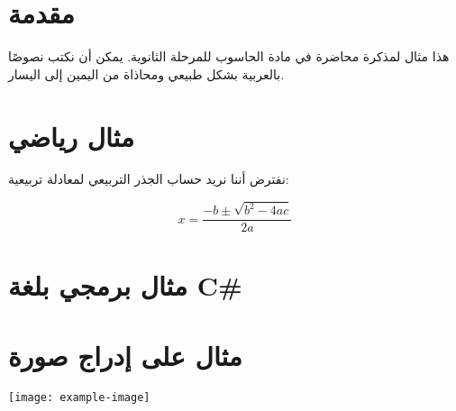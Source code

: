 \documentclass[12pt]{article}
\newif\ifwithcode
\begin{document}
\section*{مقدمة}

هذا مثال لمذكرة محاضرة في مادة الحاسوب للمرحلة الثانوية.
يمكن أن نكتب نصوصًا بالعربية بشكل طبيعي ومحاذاة من اليمين إلى اليسار.

\section*{مثال رياضي}

نفترض أننا نريد حساب الجذر التربيعي لمعادلة تربيعية:

\begin{equation}
x = \frac{-b \pm \sqrt{b^2 - 4ac}}{2a}
\end{equation}

\section*{مثال برمجي بلغة C\#}

\ifwithcode
\begin{english}
\begin{lstlisting}
// C# Example
using System;

class Program {
    static void Main() {
        Console.WriteLine("Hello, world!");
    }
}
\end{lstlisting}
\end{english}
\fi

\section*{مثال على إدراج صورة}

\begin{center}
\texttt{[image: example-image]} %
\end{center}
\end{document}
